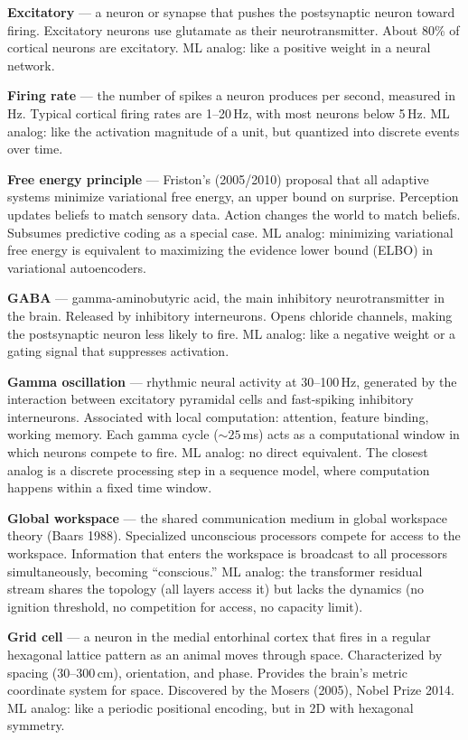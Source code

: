 \documentclass[11pt,a4paper]{article}
\begin{document}
\textbf{Excitatory} --- a neuron or synapse that pushes the postsynaptic neuron toward firing. Excitatory neurons use glutamate as their neurotransmitter. About 80\% of cortical neurons are excitatory. ML analog: like a positive weight in a neural network.

\textbf{Firing rate} --- the number of spikes a neuron produces per second, measured in Hz. Typical cortical firing rates are 1--20\,Hz, with most neurons below 5\,Hz. ML analog: like the activation magnitude of a unit, but quantized into discrete events over time.

\textbf{Free energy principle} --- Friston's (2005/2010) proposal that all adaptive systems minimize variational free energy, an upper bound on surprise. Perception updates beliefs to match sensory data. Action changes the world to match beliefs. Subsumes predictive coding as a special case. ML analog: minimizing variational free energy is equivalent to maximizing the evidence lower bound (ELBO) in variational autoencoders.

\textbf{GABA} --- gamma-aminobutyric acid, the main inhibitory neurotransmitter in the brain. Released by inhibitory interneurons. Opens chloride channels, making the postsynaptic neuron less likely to fire. ML analog: like a negative weight or a gating signal that suppresses activation.

\textbf{Gamma oscillation} --- rhythmic neural activity at 30--100\,Hz, generated by the interaction between excitatory pyramidal cells and fast-spiking inhibitory interneurons. Associated with local computation: attention, feature binding, working memory. Each gamma cycle (${\sim}25$\,ms) acts as a computational window in which neurons compete to fire. ML analog: no direct equivalent. The closest analog is a discrete processing step in a sequence model, where computation happens within a fixed time window.

\textbf{Global workspace} --- the shared communication medium in global workspace theory (Baars 1988). Specialized unconscious processors compete for access to the workspace. Information that enters the workspace is broadcast to all processors simultaneously, becoming ``conscious.'' ML analog: the transformer residual stream shares the topology (all layers access it) but lacks the dynamics (no ignition threshold, no competition for access, no capacity limit).

\textbf{Grid cell} --- a neuron in the medial entorhinal cortex that fires in a regular hexagonal lattice pattern as an animal moves through space. Characterized by spacing (30--300\,cm), orientation, and phase. Provides the brain's metric coordinate system for space. Discovered by the Mosers (2005), Nobel Prize 2014. ML analog: like a periodic positional encoding, but in 2D with hexagonal symmetry.
\end{document}

